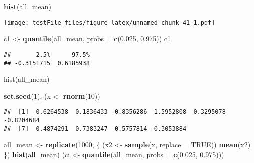 \documentclass[]{article}
\newenvironment{Shaded}{\begin{snugshade}}{\end{snugshade}}
\newcommand{\DataTypeTok}[1]{\textcolor[rgb]{0.13,0.29,0.53}{#1}}
\newcommand{\DecValTok}[1]{\textcolor[rgb]{0.00,0.00,0.81}{#1}}
\newcommand{\FloatTok}[1]{\textcolor[rgb]{0.00,0.00,0.81}{#1}}
\newcommand{\KeywordTok}[1]{\textcolor[rgb]{0.13,0.29,0.53}{\textbf{#1}}}
\newcommand{\NormalTok}[1]{#1}
\newcommand{\OtherTok}[1]{\textcolor[rgb]{0.56,0.35,0.01}{#1}}
\newcommand{\StringTok}[1]{\textcolor[rgb]{0.31,0.60,0.02}{#1}}
\begin{document}
\begin{Shaded}
\begin{Highlighting}[]
\KeywordTok{hist}\NormalTok{(all_mean)}
\end{Highlighting}
\end{Shaded}

\texttt{[image: testFile\_files/figure-latex/unnamed-chunk-41-1.pdf]}

\begin{Shaded}
\begin{Highlighting}[]
\NormalTok{c1 <-}\StringTok{ }\KeywordTok{quantile}\NormalTok{(all_mean, }\DataTypeTok{probs =} \KeywordTok{c}\NormalTok{(}\FloatTok{0.025}\NormalTok{, }\FloatTok{0.975}\NormalTok{))}
\NormalTok{c1}
\end{Highlighting}
\end{Shaded}

\begin{verbatim}
##       2.5%      97.5% 
## -0.3151715  0.6185938
\end{verbatim}

hist(all\_mean)

\begin{Shaded}
\begin{Highlighting}[]
\KeywordTok{set.seed}\NormalTok{(}\DecValTok{1}\NormalTok{); (x <-}\StringTok{ }\KeywordTok{rnorm}\NormalTok{(}\DecValTok{10}\NormalTok{))}
\end{Highlighting}
\end{Shaded}

\begin{verbatim}
##  [1] -0.6264538  0.1836433 -0.8356286  1.5952808  0.3295078 -0.8204684
##  [7]  0.4874291  0.7383247  0.5757814 -0.3053884
\end{verbatim}

\begin{Shaded}
\begin{Highlighting}[]
\NormalTok{all_mean <-}\StringTok{ }\KeywordTok{replicate}\NormalTok{(}\DecValTok{1000}\NormalTok{, \{}
\NormalTok{  (x2 <-}\StringTok{ }\KeywordTok{sample}\NormalTok{(x, }\DataTypeTok{replace =} \OtherTok{TRUE}\NormalTok{))}
  \KeywordTok{mean}\NormalTok{(x2)}
\NormalTok{\})}
\KeywordTok{hist}\NormalTok{(all_mean)}
\NormalTok{(ci <-}\StringTok{ }\KeywordTok{quantile}\NormalTok{(all_mean, }\DataTypeTok{probs =} \KeywordTok{c}\NormalTok{(}\FloatTok{0.025}\NormalTok{, }\FloatTok{0.975}\NormalTok{)))}
\end{Highlighting}
\end{Shaded}
\end{document}
